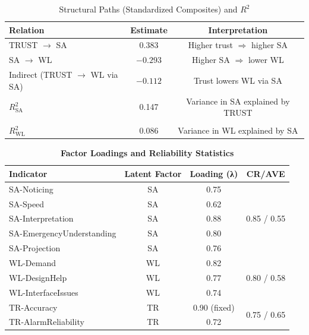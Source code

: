 \documentclass[conference]{IEEEtran}
\begin{document}
\begin{table}[h]
\centering
\caption{Structural Paths (Standardized Composites) and $R^2$}
\begin{tabular}{lcc}
\toprule
Relation & Estimate & Interpretation \\
\midrule
TRUST $\rightarrow$ SA & 0.383 & Higher trust $\Rightarrow$ higher SA \\

SA $\rightarrow$ WL    & $-0.293$ & Higher SA $\Rightarrow$ lower WL \\

Indirect (TRUST $\rightarrow$ WL via SA) & $-0.112$ & Trust lowers WL via SA \\

$R^2_{\text{SA}}$ & 0.147 & Variance in SA explained by TRUST \\
\\
$R^2_{\text{WL}}$ & 0.086 & Variance in WL explained by SA \\
\bottomrule
\end{tabular}
\end{table}
\begin{table}[h]

\caption{\textbf{Factor Loadings and Reliability Statistics}}

\begin{tabular}{lccc}
\toprule
Indicator & Latent Factor & Loading (λ) & CR/AVE \\

\midrule
SA-Noticing & SA & 0.75 
& \multirow{5}{*}{0.85 / 0.55} \\
SA-Speed & SA & 0.62 & \\
SA-Interpretation & SA & 0.88 & \\
SA-EmergencyUnderstanding & SA & 0.80 & \\
SA-Projection & SA & 0.76 & \\
WL-Demand & WL & 0.82 & \multirow{3}{*}{0.80 / 0.58} \\
WL-DesignHelp & WL & 0.77 & \\
WL-InterfaceIssues & WL & 0.74 & \\
TR-Accuracy & TR & 0.90 (fixed) & \multirow{2}{*}{0.75 / 0.65} \\
TR-AlarmReliability & TR & 0.72 & \\
\bottomrule
\end{tabular}
\end{table}
\end{document}

